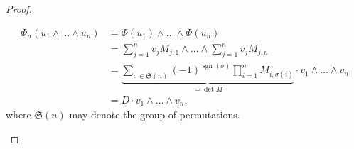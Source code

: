 \documentclass{article}
\theoremstyle{plain}%
\theoremstyle{definition}
\theoremstyle{remark}
\begin{document}
\begin{proof}
\begin{enumerate}
            \begin{align*}
                \Phi_n(u_1 \wedge \dots \wedge u_n) &= \Phi(u_1) \wedge \dots \wedge \Phi(u_n)\\
                &= \sum_{j=1}^n v_jM_{j,1} \wedge \dots \wedge \sum_{j=1}^n v_jM_{j,n}\\
                &= \underbrace{\sum_{\sigma \in \mathfrak{S}(n)} (-1)^{\operatorname{sgn}(\sigma)} \prod_{i=1}^n M_{i,\sigma(i)}}_{= \det M} \cdot v_1 \wedge \dots \wedge v_n\\
                &= D \cdot v_1 \wedge \dots \wedge v_n,
            \end{align*}
            where \(\mathfrak{S}(n)\) may denote the group of permutations.
        \end{enumerate}
    \end{proof}
\end{document}
